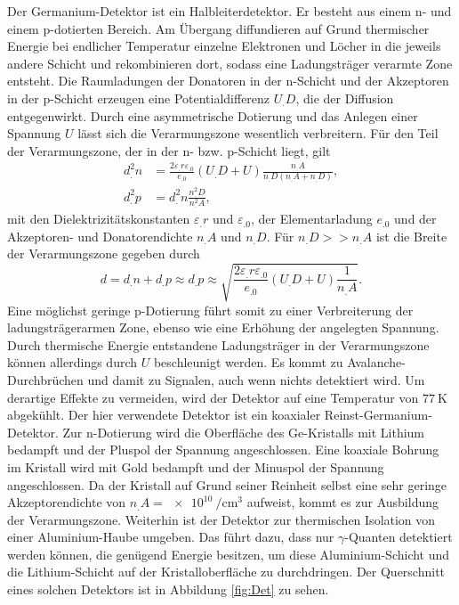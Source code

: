 Der Germanium-Detektor ist ein Halbleiterdetektor. Er besteht aus einem n- und einem p-dotierten Bereich. Am Übergang diffundieren auf Grund thermischer Energie bei endlicher Temperatur einzelne Elektronen und Löcher in die jeweils andere Schicht und rekombinieren dort, sodass eine Ladungsträger verarmte Zone entsteht. Die Raumladungen der Donatoren in der n-Schicht und der Akzeptoren in der p-Schicht erzeugen eine Potentialdifferenz $U_.D$, die der Diffusion entgegenwirkt.
Durch eine asymmetrische Dotierung und das Anlegen einer Spannung $U$ lässt sich die Verarmungszone wesentlich verbreitern.
Für den Teil der Verarmungszone, der in der n- bzw. p-Schicht liegt, gilt
\begin{align*}
d^2_.n&=\frac{2\varepsilon_.r\varepsilon_.0}{e_.0}\left(U_.D+U\right)\frac{n_.A}{n_.D\left(n_.A+n_.D\right)},\\
d^2_.p&=d^2_.n\frac{n^2_.D}{n^2_.A},
\end{align*}
mit den Dielektrizitätskonstanten $\varepsilon_.r$ und $\varepsilon_.0$, der Elementarladung $e_.0$ und der Akzeptoren- und Donatorendichte $n_.A$ und $n_.D$.
Für $n_.D>>n_.A$ ist die Breite der Verarmungszone gegeben durch
\begin{equation}
d=d_.n+d_.p\approx d_.p\approx\sqrt{\frac{2\varepsilon_.r\varepsilon_.0}{e_.0}\left(U_.D+U\right)\frac{1}{n_.A}}\text{.}
\end{equation}
Eine möglichst geringe p-Dotierung führt somit zu einer Verbreiterung der ladungsträgerarmen Zone, ebenso wie eine Erhöhung der angelegten Spannung. Durch thermische Energie entstandene Ladungsträger in der Verarmungszone können allerdings durch $U$ beschleunigt werden. Es kommt zu Avalanche-Durchbrüchen und damit zu Signalen, auch wenn nichts detektiert wird.
Um derartige Effekte zu vermeiden, wird der Detektor auf eine Temperatur von $\SI{77}{\kelvin}$ abgekühlt.
Der hier verwendete Detektor ist ein koaxialer Reinst-Germanium-Detektor. Zur n-Dotierung wird die Oberfläche des Ge-Kristalls mit Lithium bedampft und der Pluspol der Spannung angeschlossen.
Eine koaxiale Bohrung im Kristall wird mit Gold bedampft und der Minuspol der Spannung angeschlossen. Da der Kristall auf Grund seiner Reinheit selbst eine sehr geringe Akzeptorendichte von $n_.A=\SI{e10}{\per\cm^3}$ aufweist, kommt es zur Ausbildung der Verarmungszone. Weiterhin ist der Detektor zur thermischen Isolation von einer Aluminium-Haube umgeben. Das führt dazu, dass nur $\gamma$-Quanten detektiert werden können, die genügend Energie besitzen, um diese Aluminium-Schicht und die Lithium-Schicht auf der Kristalloberfläche zu durchdringen. Der Querschnitt eines solchen Detektors ist in Abbildung \ref{fig:Det} zu sehen.
